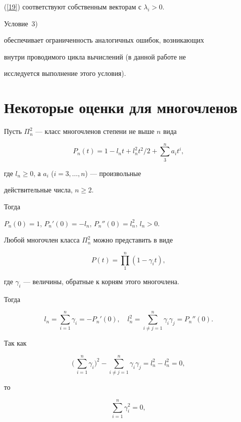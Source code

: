 (\ref{19}) соответствуют собственным векторам с $\lambda_i >0$.


Условие~3)


обеспечивает ограниченность аналогичных ошибок, возникающих


внутри проводимого цикла вычислений (в данной работе не


исследуется выполнение этого условия).





\section{Некоторые оценки для многочленов}





Пусть $\Pi^2_n$ --- класс многочленов степени не выше $n$ вида


$$


P_n(t)=1-l_nt+l^2_nt^2/2 + \sum_3^n a_i t^i,


$$


где $l_n \ge 0$, а $a_i$ ($i=3,\dotsc,n$) --- произвольные


действительные числа, $n\ge 2$.


Тогда


$P_n(0)=1$, $P_n'(0)=-l_n$, $P_n''(0)=l^2_n$, $l_n>0$.


Любой многочлен класса $\Pi^2_n$ можно представить в виде


$$


P (t)=\prod_1^n (1-\gamma_i t),


$$


где $\gamma_i$ --- величины, обратные к корням этого многочлена.


Тогда


$$


l_n = \sum_{i=1}^n \gamma_i =-P_n'(0), \quad


l^2_n = \sum_{i\ne j=1}^n \gamma_i \gamma_j = P_n''(0).


$$


Так как


$$


\bigg(\,\sum_{i=1}^n \gamma_i\bigg)^2 -\sum_{i\ne j=1}^n \gamma_i \gamma_j


=l^2_n-l^2_n =0,


$$


то


\begin{equation}


\sum_{i=1}^n \gamma^2_i=0,


\label{26}


\end{equation}


